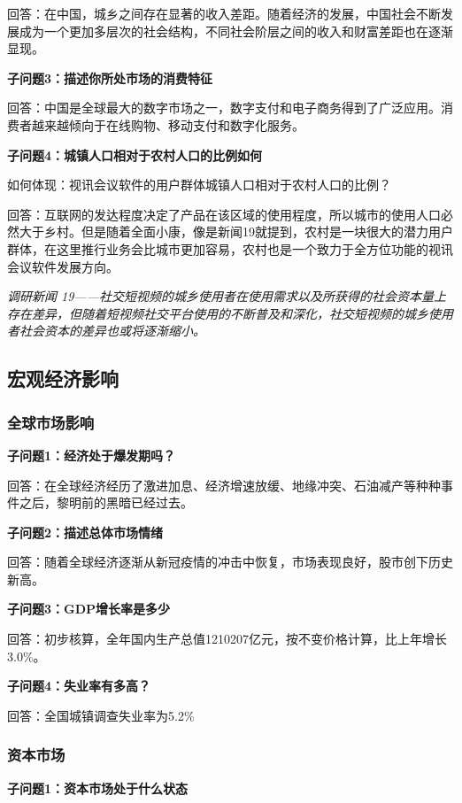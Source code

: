 \documentclass[a4paper,12pt]{article}
\begin{document}
    回答：在中国，城乡之间存在显著的收入差距。随着经济的发展，中国社会不断发展成为一个更加多层次的社会结构，不同社会阶层之间的收入和财富差距也在逐渐显现。

    \textbf{子问题3：描述你所处市场的消费特征}

    回答：中国是全球最大的数字市场之一，数字支付和电子商务得到了广泛应用。消费者越来越倾向于在线购物、移动支付和数字化服务。

    \textbf{子问题4：城镇人口相对于农村人口的比例如何}

    如何体现：视讯会议软件的⽤户群体城镇⼈⼝相对于农村⼈⼝的⽐例？

    回答：互联⽹的发达程度决定了产品在该区域的使⽤程度，所以城市的使⽤⼈⼝必然⼤于乡村。但是随着全⾯⼩康，像是新闻19就提到，农村是⼀块很⼤的潜⼒⽤户群体，在这⾥推⾏业务会⽐城市更加容易，农村也是⼀个致⼒于全⽅位功能的视讯会议软件发展⽅向。

    \textit{调研新闻 19——社交短视频的城乡使⽤者在使⽤需求以及所获得的社会资本量上存在差异，但随着短视频社交平台使⽤的不断普及和深化，社交短视频的城乡使⽤者社会资本的差异也或将逐渐缩⼩。}

    \textit{}

    \subsection{宏观经济影响}
    \subsubsection{全球市场影响}
    \textbf{子问题1：经济处于爆发期吗？}

    回答：在全球经济经历了激进加息、经济增速放缓、地缘冲突、石油减产等种种事件之后，黎明前的黑暗已经过去。
    
    \textbf{子问题2：描述总体市场情绪}

    回答：随着全球经济逐渐从新冠疫情的冲击中恢复，市场表现良好，股市创下历史新高。

    \textbf{子问题3：GDP增长率是多少}

    回答：初步核算，全年国内生产总值1210207亿元，按不变价格计算，比上年增长3.0\%。

    \textbf{子问题4：失业率有多高？}

    回答：全国城镇调查失业率为5.2\%

    \subsubsection{资本市场}
    \textbf{子问题1：资本市场处于什么状态}
\end{document}
